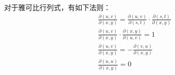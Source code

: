 对于雅可比行列式，有如下法则：
\begin{align*}
&\frac{\partial \left( u,v \right)}{\partial \left( x,y \right)}=\frac{\partial \left( u,v \right)}{\partial \left( s,t \right)}\cdot \frac{\partial \left( s,t \right)}{\partial \left( x,y \right)} \\
&\frac{\partial \left( u,v \right)}{\partial \left( x,y \right)}\cdot \frac{\partial \left( x,y \right)}{\partial \left( u,v \right)}=1 \\
&\frac{\partial \left( u,v \right)}{\partial \left( x,y \right)}=-\frac{\partial \left( v,u \right)}{\partial \left( x,y \right)} \\
&\frac{\partial \left( u,u \right)}{\partial \left( x,y \right)}=0
\end{align*}




